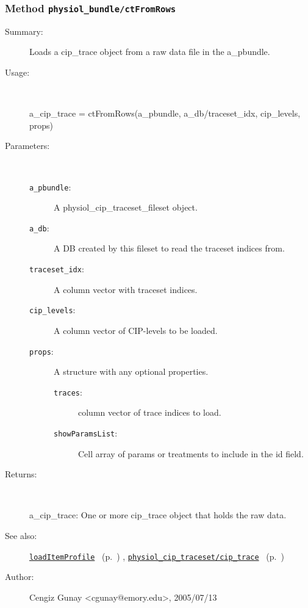 \subsubsection[Method \texttt{ctFromRows}]{Method \texttt{physiol\_bundle/ctFromRows}}%
%
\label{ref_physiol_bundle__ctFromRows}%
\hypertarget{ref_physiol_bundle__ctFromRows}{}%
\begin{description}
\item[Summary:]Loads a cip\_trace object from a raw data file in the a\_pbundle.
%
\item[Usage:]~%
\begin{lyxcode}%
a\_cip\_trace = ctFromRows(a\_pbundle, a\_db/traceset\_idx, cip\_levels, props)
%
\end{lyxcode}%
%
%
\item[Parameters:]~
\begin{description}%
\item[\texttt{a\_pbundle}:]
 A physiol\_cip\_traceset\_fileset object.
\item[\texttt{a\_db}:]
 A DB created by this fileset to read the traceset indices from.
\item[\texttt{traceset\_idx}:]
 A column vector with traceset indices.
\item[\texttt{cip\_levels}:]
 A column vector of CIP-levels to be loaded.
\item[\texttt{props}:]
 A structure with any optional properties.
\begin{description}%
\item[\texttt{traces}:]
 column vector of trace indices to load.
\item[\texttt{showParamsList}:]
 Cell array of params or treatments to include in the id field.
\end{description}%
\end{description}%
%
\item[Returns:]~

	a\_cip\_trace: One or more cip\_trace object that holds the raw data.
%
%
\item[See also:]%
\hyperlink{ref_loadItemProfile}{\texttt{loadItemProfile}}%
\ (p.~\pageref{ref_loadItemProfile})%
%
, \hyperlink{ref_physiol_cip_traceset__cip_trace}{\texttt{physiol\_cip\_traceset/cip\_trace}}%
\ (p.~\pageref{ref_physiol_cip_traceset__cip_trace})%
%
%
\item[Author:]%
Cengiz Gunay <cgunay@emory.edu>, 2005/07/13%
\end{description}
\methodline%
